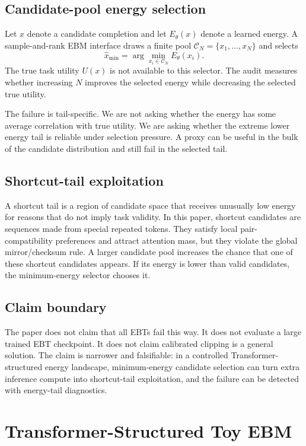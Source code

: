 \documentclass{article}
\newcommand{\energy}{E_\theta}
\newcommand{\true}{U}
\newcommand{\pool}{\mathcal{C}}
\begin{document}
\subsection{Candidate-pool energy selection}

Let $x$ denote a candidate completion and let $\energy(x)$ denote a learned
energy. A sample-and-rank EBM interface draws a finite pool
$\pool_N=\{x_1,\ldots,x_N\}$ and selects
\[
\hat{x}_{\min}=\arg\min_{x_i\in\pool_N}\energy(x_i).
\]
The true task utility $\true(x)$ is not available to this selector. The audit
measures whether increasing $N$ improves the selected energy while decreasing
the selected true utility.

The failure is tail-specific. We are not asking whether the energy has some
average correlation with true utility. We are asking whether the extreme lower
energy tail is reliable under selection pressure. A proxy can be useful in the
bulk of the candidate distribution and still fail in the selected tail.

\subsection{Shortcut-tail exploitation}

A shortcut tail is a region of candidate space that receives unusually low
energy for reasons that do not imply task validity. In this paper, shortcut
candidates are sequences made from special repeated tokens. They satisfy local
pair-compatibility preferences and attract attention mass, but they violate the
global mirror/checksum rule. A larger candidate pool increases the chance that
one of these shortcut candidates appears. If its energy is lower than valid
candidates, the minimum-energy selector chooses it.

\subsection{Claim boundary}

The paper does not claim that all EBTs fail this way. It does not evaluate a
large trained EBT checkpoint. It does not claim calibrated clipping is a
general solution. The claim is narrower and falsifiable: in a controlled
Transformer-structured energy landscape, minimum-energy candidate selection can
turn extra inference compute into shortcut-tail exploitation, and the failure
can be detected with energy-tail diagnostics.

\section{Transformer-Structured Toy EBM}
\end{document}
